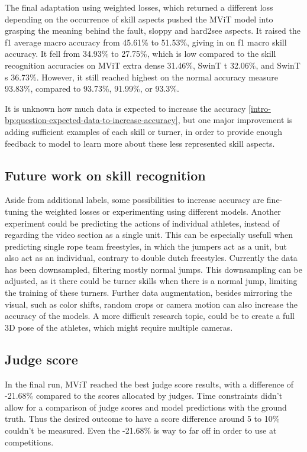 The final adaptation using weighted losses, which returned a different loss depending on the occurrence of skill aspects pushed the MViT model into grasping the meaning behind the fault, sloppy and hard2see aspects. It raised the f1 average macro accuracy from 45.61\% to 51.53\%, giving in on f1 macro skill accuracy. It fell from 34.93\% to 27.75\%, which is low compared to the skill recognition accuracies on MViT extra dense 31.46\%, SwinT t 32.06\%, and SwinT s 36.73\%. However, it still reached highest on the normal accuracy measure 93.83\%, compared to 93.73\%, 91.99\%, or 93.3\%.

It is unknown how much data is expected to increase the accuracy \ref{intro-bp:question-expected-data-to-increase-accuracy}, but one major improvement is adding sufficient examples of each skill or turner, in order to provide enough feedback to model to learn more about these less represented skill aspects.

\subsection{Future work on skill recognition}

Aside from additional labels, some possibilities to increase accuracy are fine-tuning the weighted losses or experimenting using different models. Another experiment could be predicting the actions of individual athletes, instead of regarding the video section as a single unit. This can be especially usefull when predicting single rope team freestyles, in which the jumpers act as a unit, but also act as an individual, contrary to double dutch freestyles. Currently the data has been downsampled, filtering mostly normal jumps. This downsampling can be adjusted, as it there could be turner skills when there is a normal jump, limiting the training of these turners. Further data augmentation, besides mirroring the visual, such as color shifts, random crops or camera motion can also increase the accuracy of the models. A more difficult research topic, could be to create a full 3D pose of the athletes, which might require multiple cameras. 

\subsection{Judge score}

In the final run, MViT reached the best judge score results, with a difference of -21.68\% compared to the scores allocated by judges.
Time constraints didn't allow for a comparison of judge scores and model predictions with the ground truth. Thus the desired outcome to have a score difference around 5 to 10\% couldn't be measured. Even the -21.68\% is way to far off in order to use at competitions.

